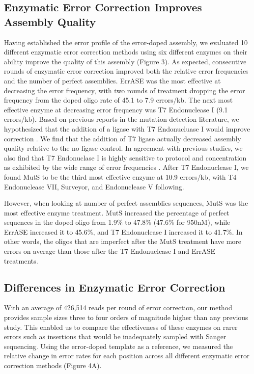 \documentclass[twocolumn]{article}
\begin{document}

\subsection*{Enzymatic Error Correction Improves Assembly Quality}

Having established the error profile of the error-doped assembly, we evaluated 10 different enzymatic error correction methods using six different enzymes on their ability improve the quality of this assembly (Figure 3). As expected, consecutive rounds of enzymatic error correction improved both the relative error frequencies and the number of perfect assemblies. ErrASE was the most effective at decreasing the error frequency, with two rounds of treatment dropping the error frequency from the doped oligo rate of 45.1 to 7.9 errors/kb. The next most effective enzyme at decreasing error frequency was T7 Endonuclease I (9.1 errors/kb). Based on previous reports in the mutation detection literature, we hypothesized that the addition of a ligase with T7 Endonucluase I would improve correction \cite{huang2012}. We find that the addition of T7 ligase actually decreased assembly quality relative to the no ligase control. In agreement with previous studies, we also find that T7 Endonuclase I is highly sensitive to protocol and concentration as exhibited by the wide range of error frequencies \cite{fuhrmann2005,sequeira2016}. After T7 Endonuclease I, we found MutS to be the third most effective enzyme at 10.9 errors/kb, with T4 Endonuclease VII, Surveyor, and Endonuclease V following.

However, when looking at number of perfect assemblies sequences, MutS was the most effective enzyme treatment. MutS increased the percentage of perfect sequences in the doped oligo from 1.9\% to 47.8\% (47.6\% for 950nM), while ErrASE increased it to 45.6\%, and T7 Endonuclease I increased it to 41.7\%. In other words, the oligos that are imperfect after the MutS treatment have more errors on average than those after the T7 Endonuclease I and ErrASE treatments.


\subsection*{Differences in Enzymatic Error Correction}

With an average of 426,514 reads per round of error correction, our method provides sample sizes three to four orders of magnitude higher than any previous study. This enabled us to compare the effectiveness of these enzymes on rarer errors such as insertions that would be inadequately sampled with Sanger sequencing. Using the error-doped template as a reference, we measured the relative change in error rates for each position across all different enzymatic error correction methods (Figure 4A).
\end{document}
